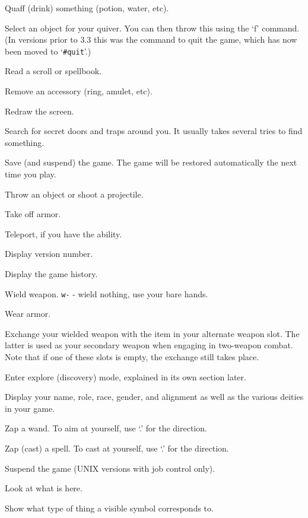 \item[\tb{q}]
Quaff (drink) something (potion, water, etc).
\item[\tb{Q}]
Select an object for your quiver.  You can then throw this using
the `f' command.  (In versions prior to 3.3 this was the command to quit
the game, which has now been moved to `{\tt \#quit}'.)
\item[\tb{r}]
Read a scroll or spellbook.
\item[\tb{R}]
Remove an accessory (ring, amulet, etc).
\item[\tb{\^R}]
Redraw the screen.
\item[\tb{s}]
Search for secret doors and traps around you.  It usually takes several
tries to find something.
\item[\tb{S}]
Save (and suspend) the game.  The game will be restored automatically the
next time you play.
\item[\tb{t}]
Throw an object or shoot a projectile.
\item[\tb{T}]
Take off armor.
\item[\tb{\^T}]
Teleport, if you have the ability.
\item[\tb{v}]
Display version number.
\item[\tb{V}]
Display the game history.
\item[\tb{w}]
Wield weapon.
{\tt w-} - wield nothing, use your bare hands.
\item[\tb{W}]
Wear armor.
\item[\tb{x}]
Exchange your wielded weapon with the item in your alternate
weapon slot.  The latter is used as your secondary weapon when engaging in
two-weapon combat.  Note that if one of these slots is empty,
the exchange still takes place.
\item[\tb{X}]
Enter explore (discovery) mode, explained in its own section later.
\item[\tb{\^X}]
Display your name, role, race, gender, and alignment as well as
the various deities in your game.
\item[\tb{z}]
Zap a wand.  To aim at yourself, use `.' for the direction.
\item[\tb{Z}]
Zap (cast) a spell.  To cast at yourself, use `.' for the direction.
\item[\tb{\^Z}]
Suspend the game (UNIX versions with job control only).
\item[\tb{:}]
Look at what is here.
\item[\tb{;}]
Show what type of thing a visible symbol corresponds to.

